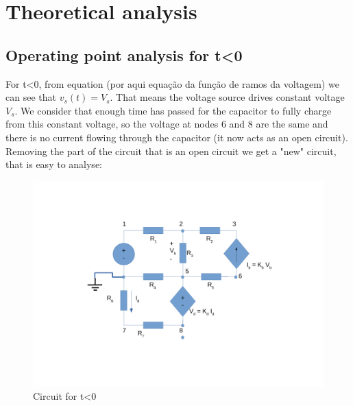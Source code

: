 \section{Theoretical analysis}
\label{sec:ta}
\subsection{Operating point analysis for t\textless0}
\label{ssec:tl}
For t\textless0, from equation (por aqui equação da função de ramos da voltagem) we can see that $v_s (t)= V_s$. That means the voltage source drives constant voltage $V_s$. We consider that enough time has passed for the capacitor to fully charge from this constant voltage, so the voltage at nodes 6 and 8 are the same and there is no current flowing through the capacitor (it now acts as an open circuit). Removing the part of the circuit that is an open circuit we get a "new" circuit, that is easy to analyse: \\
\begin{figure}[H] \centering
\includegraphics[width=0.8\linewidth]{tmenor0.pdf}
\caption{Circuit for t\textless0}
\label{fig:zim}
\end{figure}

